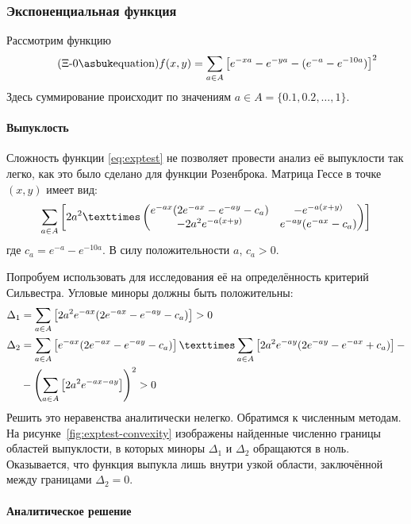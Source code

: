 \subsubsection{Экспоненциальная функция}
\label{sec:exptest}

Рассмотрим функцию
\begin{equation}
  \label{eq:exptest}
  \tag{$\Xi$-\theequation}
  f(x, y) = \suml_{a\in A}\left [
    e^{-xa}-e^{-ya}-(e^{-a}-e^{-10a})\right ]^2
\end{equation}
Здесь суммирование происходит по значениям $a \in A =\{0.1, 0.2, \dotsc, 1\}$.

\paragraph{Выпуклость}

Сложность функции \eqref{eq:exptest} не позволяет провести анализ её
выпуклости так легко, как это было сделано для функции Розенброка.
Матрица Гессе в точке $(x, y)$ имеет вид:
\begin{equation}
  \label{eq:exptest-hess}
  \suml_{a\in A}\left[2a^2×
  \begin{pmatrix}
    e^{-ax}(2e^{-ax}-e^{-ay}-c_a) & -e^{-a(x+y)} \\
    -2a^2e^{-a(x+y)} & e^{-ay}(e^{-ax}-c_a)
  \end{pmatrix}\right]
\end{equation}
где $c_a = e^{-a}-e^{-10a}$. В силу положительности $a$, $c_a>0$.

Попробуем использовать для исследования её на определённость критерий
Сильвестра. Угловые миноры должны быть положительны:
\begin{align*}
  \Delta_1 &= \suml_{a\in A}
  \left[ 2a^2e^{-ax}(2e^{-ax}-e^{-ay}-c_a) \right] > 0\\
  \Delta_2 &= \suml_{a\in A}
  \left[ e^{-ax}(2e^{-ax}-e^{-ay}-c_a) \right]×
  \suml_{a\in A}
  \left[ 2a^2e^{-ay}(2e^{-ay}-e^{-ax}+c_a) \right]-\\
  &-\left(\suml_{a\in A}
  \left[ 2a^2e^{-ax-ay} \right] \right)^2
  > 0
\end{align*}
Решить это неравенства аналитически нелегко. Обратимся к численным
методам. На рисунке \ref{fig:exptest-convexity} изображены найденные
численно границы областей выпуклости, в которых миноры $\Delta_1$ и
$\Delta_2$ обращаются в ноль. Оказывается, что функция выпукла лишь
внутри узкой области, заключённой между границами $\Delta_2=0$.

\paragraph{Аналитическое решение}

